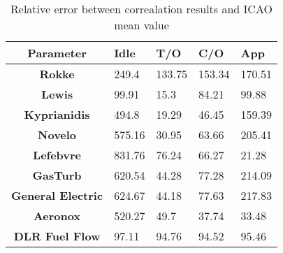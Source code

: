 \begin{table}[h!]
  \centering
  \begin{tabularx}{\textwidth}{||c|X|X|X|X||}
  \hline
    \cellcolor{gray!20}\textbf{Parameter} & \cellcolor{gray!20}\textbf{Idle} & \cellcolor{gray!20}\textbf{T/O} & \cellcolor{gray!20}\textbf{C/O} & \cellcolor{gray!20}\textbf{App} \\ [0.5ex]
  \hline\hline
\centering
    \cellcolor{gray!20}\textbf{Rokke} & 249.4 & 133.75 & 153.34 & 170.51 \\
  \hline
    \cellcolor{gray!20}\textbf{Lewis} & 99.91 & 15.3 & 84.21 & 99.88 \\
  \hline
    \cellcolor{gray!20}\textbf{Kyprianidis} & 494.8 & 19.29 & 46.45 & 159.39 \\
  \hline
    \cellcolor{gray!20}\textbf{Novelo} & 575.16 & 30.95 & 63.66 & 205.41 \\
  \hline
    \cellcolor{gray!20}\textbf{Lefebvre} & 831.76 & 76.24 & 66.27 & 21.28 \\
  \hline
    \cellcolor{gray!20}\textbf{GasTurb} & 620.54 & 44.28 & 77.28 & 214.09 \\
  \hline
    \cellcolor{gray!20}\textbf{General Electric} & 624.67 & 44.18 & 77.63 & 217.83 \\
  \hline
    \cellcolor{gray!20}\textbf{Aeronox} & 520.27 & 49.7 & 37.74 & 33.48 \\
  \hline
    \cellcolor{gray!20}\textbf{DLR Fuel Flow} & 97.11 & 94.76 & 94.52 & 95.46 \\
  \hline
  \end{tabularx}
  \caption{Relative error between correalation results and ICAO mean value}
  \label{tab:relec}
\end{table}
